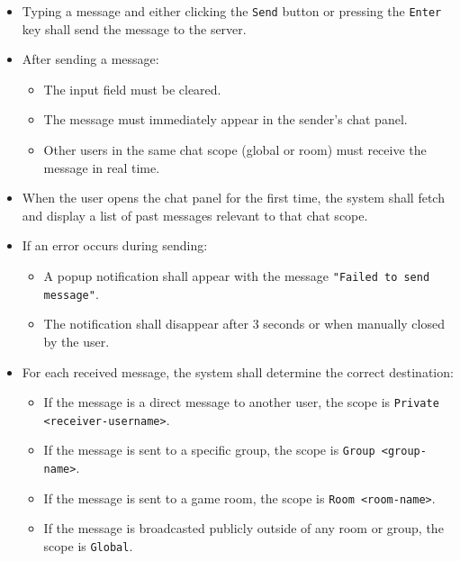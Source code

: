 \documentclass[]{VUMIFTemplateClass}
\begin{document}
\begin{itemize}
    \item Typing a message and either clicking the \texttt{Send} button or pressing the \texttt{Enter} key shall send the message to the server.
    \item After sending a message:
    \begin{itemize}
        \item The input field must be cleared.
        \item The message must immediately appear in the sender's chat panel.
        \item Other users in the same chat scope (global or room) must receive the message in real time.
    \end{itemize}
    \item When the user opens the chat panel for the first time, the system shall fetch and display a list of past messages relevant to that chat scope.
    \item If an error occurs during sending:
    \begin{itemize}
        \item A popup notification shall appear with the message \texttt{"Failed to send message"}.
        \item The notification shall disappear after 3 seconds or when manually closed by the user.
    \end{itemize}
    \item For each received message, the system shall determine the correct destination:
    \begin{itemize}
        \item If the message is a direct message to another user, the scope is \texttt{Private <receiver-username>}.
        \item If the message is sent to a specific group, the scope is \texttt{Group <group-name>}.
        \item If the message is sent to a game room, the scope is \texttt{Room <room-name>}.
        \item If the message is broadcasted publicly outside of any room or group, the scope is \texttt{Global}.
    \end{itemize}
\end{itemize}

\end{document}
